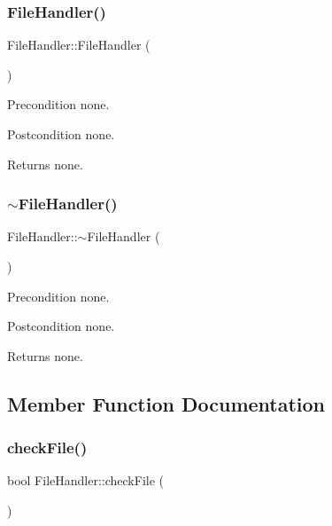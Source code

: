 \subsubsection{\texorpdfstring{File\+Handler()}{FileHandler()}}
{\footnotesize\ttfamily File\+Handler\+::\+File\+Handler (\begin{DoxyParamCaption}{ }\end{DoxyParamCaption})}

\begin{DoxyPrecond}{Precondition}
none. 
\end{DoxyPrecond}
\begin{DoxyPostcond}{Postcondition}
none. 
\end{DoxyPostcond}
\begin{DoxyReturn}{Returns}
none. 
\end{DoxyReturn}
\mbox{\label{class_file_handler_a1ce10cd0ad31b313a8d526fba6f1e676}} 
\subsubsection{\texorpdfstring{$\sim$\+File\+Handler()}{~FileHandler()}}
{\footnotesize\ttfamily File\+Handler\+::$\sim$\+File\+Handler (\begin{DoxyParamCaption}{ }\end{DoxyParamCaption})}

\begin{DoxyPrecond}{Precondition}
none. 
\end{DoxyPrecond}
\begin{DoxyPostcond}{Postcondition}
none. 
\end{DoxyPostcond}
\begin{DoxyReturn}{Returns}
none. 
\end{DoxyReturn}


\subsection{Member Function Documentation}
\mbox{\label{class_file_handler_a9c5150acc7f815f70779198b6253a537}} 
\subsubsection{\texorpdfstring{check\+File()}{checkFile()}}
{\footnotesize\ttfamily bool File\+Handler\+::check\+File (\begin{DoxyParamCaption}{ }\end{DoxyParamCaption})\hspace{0.3cm}{\ttfamily [private]}}

